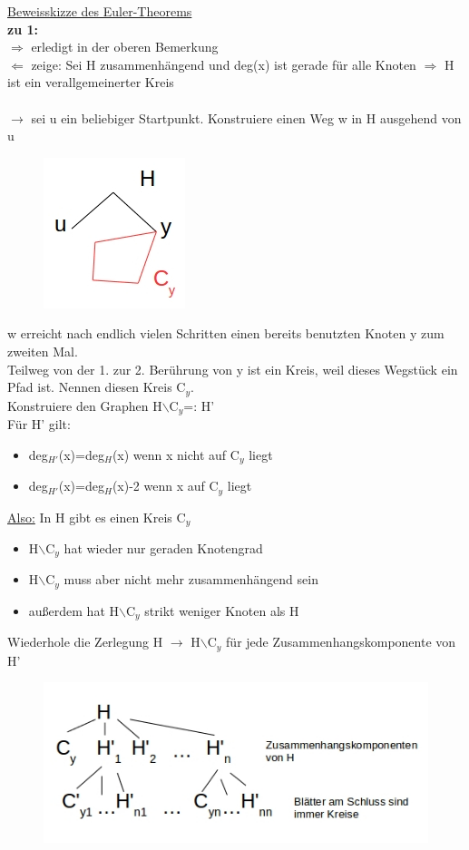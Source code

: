 \underline{Beweisskizze des Euler-Theorems}\\
\textbf{zu 1:}\\
$\Rightarrow$ erledigt in der oberen Bemerkung\\
$\Leftarrow$ zeige: Sei H zusammenhängend und deg(x) ist gerade für alle Knoten $\Rightarrow$ H ist ein verallgemeinerter Kreis
\\\\
$\rightarrow$ sei u ein beliebiger Startpunkt. Konstruiere einen Weg w in H ausgehend von u
\begin{figure}[htp]
\centering
\includegraphics[scale=0.75]{lectures/161104/pix/pic2.jpg}
\end{figure}
\newpage
w erreicht nach endlich vielen Schritten einen bereits benutzten Knoten y zum zweiten Mal.\\
Teilweg von der 1. zur 2. Berührung von y ist ein Kreis, weil dieses Wegstück ein Pfad ist. Nennen diesen Kreis C$_y$.\\
Konstruiere den Graphen H$\backslash$C$_y$=: H'\\
Für H' gilt:
\begin{itemize}
	\item deg$_{H'}$(x)=deg$_H$(x) wenn x nicht auf C$_y$ liegt
	\item deg$_{H'}$(x)=deg$_H$(x)-2 wenn x auf C$_y$ liegt
\end{itemize}

\underline{Also:} In H gibt es einen Kreis C$_y$
\begin{itemize}
	\item H$\backslash$C$_y$ hat wieder nur geraden Knotengrad
	\item H$\backslash$C$_y$ muss aber nicht mehr zusammenhängend sein
	\item außerdem hat H$\backslash$C$_y$ strikt weniger Knoten als H
\end{itemize}

Wiederhole die Zerlegung H $\rightarrow$ H$\backslash$C$_y$ für jede Zusammenhangskomponente von H'
\begin{figure}[htp]
\centering
\includegraphics[scale=1.00]{lectures/161104/pix/pic3.jpg}
\end{figure}

